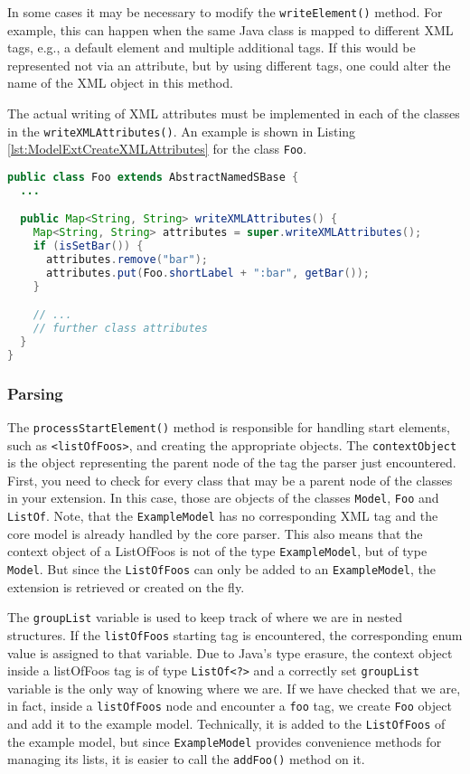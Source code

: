 In some cases it may be necessary to modify the \texttt{writeElement()} method.
For example, this can happen when the same Java class is mapped to different XML tags, e.g., a default element and multiple additional tags.
If this would be represented not via an attribute, but by using different tags, one could alter the name of the XML object in this method.

The actual writing of XML attributes must be implemented in each of the classes in the \texttt{writeXMLAttributes()}.
An example is shown in Listing \ref{lst:ModelExtCreateXMLAttributes} for the class \texttt{Foo}.

\begin{lstlisting}[language=Java,caption={Method to write the XML attributes},label={lst:ModelExtCreateXMLAttributes}]
public class Foo extends AbstractNamedSBase {
  ...

  public Map<String, String> writeXMLAttributes() {
    Map<String, String> attributes = super.writeXMLAttributes();
    if (isSetBar()) {
      attributes.remove("bar");
      attributes.put(Foo.shortLabel + ":bar", getBar());
    }

    // ...
    // further class attributes
  }
}
\end{lstlisting}


\subsubsection{Parsing}

The \texttt{processStartElement()} method is responsible for handling start elements, such as \texttt{<listOfFoos>}, and creating the appropriate objects.
The \texttt{contextObject} is the object representing the parent node of the tag the parser just encountered.
First, you need to check for every class that may be a parent node of the classes in your extension.
In this case, those are objects of the classes \texttt{Model}, \texttt{Foo} and \texttt{ListOf}.
Note, that the \texttt{ExampleModel} has no corresponding XML tag and the core model is already handled by the core parser.
This also means that the context object of a ListOfFoos is not of the type \texttt{ExampleModel}, but of type \texttt{Model}.
But since the \texttt{ListOfFoos} can only be added to an \texttt{ExampleModel}, the extension is retrieved or created on the fly.

The \texttt{groupList} variable is used to keep track of where we are in nested structures.
If the \texttt{listOfFoos} starting tag is encountered, the corresponding enum value is assigned to that variable.
Due to Java's type erasure, the context object inside a listOfFoos tag is of type \texttt{ListOf<?>} and a correctly set \texttt{groupList} variable is the only way of knowing where we are.
If we have checked that we are, in fact, inside a \texttt{listOfFoos} node and encounter a \texttt{foo} tag, we create \texttt{Foo} object and add it to the example model.
Technically, it is added to the \texttt{ListOfFoos} of the example model, but since \texttt{ExampleModel} provides convenience methods for managing its lists, it is easier to call the \texttt{addFoo()} method on it.

